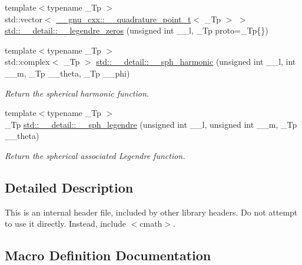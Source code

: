 \begin{DoxyCompactItemize}
{\footnotesize template$<$typename \+\_\+\+Tp $>$ }\\std\+::vector$<$ \hyperlink{struct____gnu__cxx_1_1____quadrature__point__t}{\+\_\+\+\_\+gnu\+\_\+cxx\+::\+\_\+\+\_\+quadrature\+\_\+point\+\_\+t}$<$ \+\_\+\+Tp $>$ $>$ \hyperlink{namespacestd_1_1____detail_a9d53ac0fd39232190e7564fa067a878d}{std\+::\+\_\+\+\_\+detail\+::\+\_\+\+\_\+legendre\+\_\+zeros} (unsigned int \+\_\+\+\_\+l, \+\_\+\+Tp proto=\+\_\+\+Tp\{\})
\item 
{\footnotesize template$<$typename \+\_\+\+Tp $>$ }\\std\+::complex$<$ \+\_\+\+Tp $>$ \hyperlink{namespacestd_1_1____detail_a31b9beb882431d61d439862de0366eec}{std\+::\+\_\+\+\_\+detail\+::\+\_\+\+\_\+sph\+\_\+harmonic} (unsigned int \+\_\+\+\_\+l, int \+\_\+\+\_\+m, \+\_\+\+Tp \+\_\+\+\_\+theta, \+\_\+\+Tp \+\_\+\+\_\+phi)
\begin{DoxyCompactList}\small\item\em Return the spherical harmonic function. \end{DoxyCompactList}\item 
{\footnotesize template$<$typename \+\_\+\+Tp $>$ }\\\+\_\+\+Tp \hyperlink{namespacestd_1_1____detail_a1c819d02915bdc2ab5c7693513ce0be0}{std\+::\+\_\+\+\_\+detail\+::\+\_\+\+\_\+sph\+\_\+legendre} (unsigned int \+\_\+\+\_\+l, unsigned int \+\_\+\+\_\+m, \+\_\+\+Tp \+\_\+\+\_\+theta)
\begin{DoxyCompactList}\small\item\em Return the spherical associated Legendre function. \end{DoxyCompactList}\end{DoxyCompactItemize}


\subsection{Detailed Description}
This is an internal header file, included by other library headers. Do not attempt to use it directly. Instead, include $<$cmath$>$. 

\subsection{Macro Definition Documentation}
\mbox{\label{sf__legendre_8tcc_adf9a610f8b35f611eab3b1894e967c9f}} 
